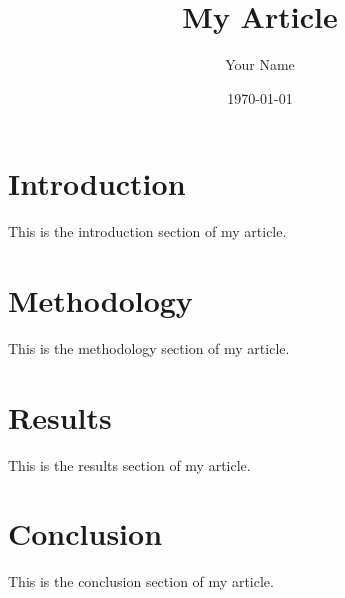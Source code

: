 \documentclass{article}
\title{My Article}
\author{Your Name}
\date{\today}
\begin{document}
\maketitle

\section{Introduction}

This is the introduction section of my article.

\section{Methodology}

This is the methodology section of my article.

\section{Results}

This is the results section of my article.

\section{Conclusion}

This is the conclusion section of my article.
\end{document}
